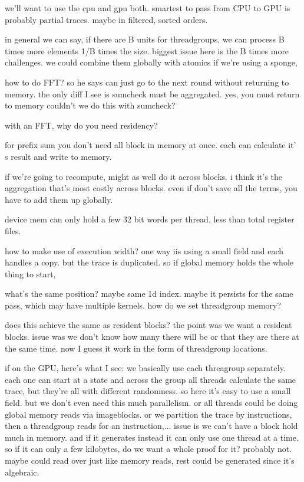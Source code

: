 we'll want to use the cpu and gpu both.
smartest to pass from CPU to GPU is probably partial traces. maybe in filtered, sorted orders. 

in general we can say, if there are B units for threadgroups, we can process B times more elements 1/B times the size. biggest issue here is the B times more challenges. we could combine them globally with atomics if we're using a sponge, 


how to do FFT?
so he says can just go to the next round without returning to memory.
the only diff I see is sumcheck must be aggregated. yes, you must return to memory 
couldn't we do this with sumcheck? 

with an FFT, why do you need residency? 

for prefix sum you don't need all block in memory at once. each can calculate it' s result and write to memory. 

if we're going to recompute, might as well do it across blocks. 
i think it's the aggregation that's most costly across blocks. even if don't save all the terms, you have to add them up globally. 

device mem can only hold a few 32 bit words per thread, less than total register files. 

how to make use of execution width?
one way iis using a small field and each handles a copy. but the trace is duplicated. 
so if global memory holds the whole thing to start, 

what's the same position? maybe same 1d index.
maybe it persists for the same pass, which may have multiple kernels. 
how do we set threadgroup memory?

does this achieve the same as resident blocks?
the point was we want a resident blocks. issue was we don't know how many there will be or that they are there at the same time. now I guess it work in the form of threadgroup locations.

if on the GPU, here's what I see:
we basically use each threagroup separately. each one can start at a state and across the group all threads calculate the same trace, but they're all with different randomness. so here it's easy to use a small field. but we don't even need this much parallelism. 
or all threads could be doing global memory reads via imageblocks. 
or we partition the trace by instructions, then a threadgroup reads for an instruction,...
issue is we can't have a block hold much in memory. and if it generates instead it can only use one thread at a time. so if it can only a few kilobytes, do we want a whole proof for it? probably not.
maybe could read over just like memory reads, rest could be generated since it's algebraic. 


